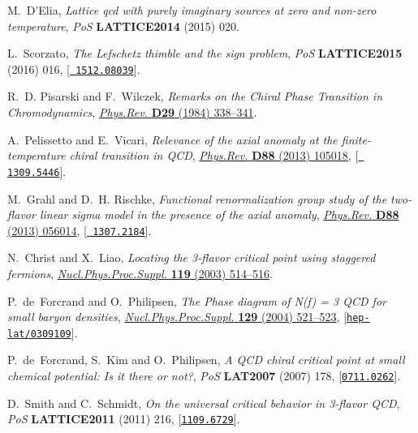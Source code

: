 \documentclass{PoS}
\begin{document}
\begin{thebibliography}{100}
M.~D'Elia, \emph{Lattice qcd with purely imaginary sources at zero and non-zero
  temperature}, {\emph{PoS} {\bf LATTICE2014} (2015) 020}.

L.~Scorzato, \emph{{The Lefschetz thimble and the sign problem}}, {\emph{PoS}
  {\bf LATTICE2015} (2016) 016}, [\href{https://arxiv.org/abs/1512.08039}{{\tt
  1512.08039}}].

R.~D. Pisarski and F.~Wilczek, \emph{{Remarks on the Chiral Phase Transition in
  Chromodynamics}},
  \href{http://dx.doi.org/10.1103/PhysRevD.29.338}{\emph{Phys.Rev.} {\bf D29}
  (1984) 338--341}.

A.~Pelissetto and E.~Vicari, \emph{{Relevance of the axial anomaly at the
  finite-temperature chiral transition in QCD}},
  \href{http://dx.doi.org/10.1103/PhysRevD.88.105018}{\emph{Phys.Rev.} {\bf
  D88} (2013) 105018}, [\href{https://arxiv.org/abs/1309.5446}{{\tt
  1309.5446}}].

M.~Grahl and D.~H. Rischke, \emph{{Functional renormalization group study of
  the two-flavor linear sigma model in the presence of the axial anomaly}},
  \href{http://dx.doi.org/10.1103/PhysRevD.88.056014}{\emph{Phys.Rev.} {\bf
  D88} (2013) 056014}, [\href{https://arxiv.org/abs/1307.2184}{{\tt
  1307.2184}}].

N.~Christ and X.~Liao, \emph{{Locating the 3-flavor critical point using
  staggered fermions}},
  \href{http://dx.doi.org/10.1016/S0920-5632(03)01600-1}{\emph{Nucl.Phys.Proc.Suppl.}
  {\bf 119} (2003) 514--516}.

P.~de~Forcrand and O.~Philipsen, \emph{{The Phase diagram of N(f) = 3 QCD for
  small baryon densities}},
  \href{http://dx.doi.org/10.1016/S0920-5632(03)02628-8}{\emph{Nucl.Phys.Proc.Suppl.}
  {\bf 129} (2004) 521--523},
  [\href{https://arxiv.org/abs/hep-lat/0309109}{{\tt hep-lat/0309109}}].

P.~de~Forcrand, S.~Kim and O.~Philipsen, \emph{{A QCD chiral critical point at
  small chemical potential: Is it there or not?}}, {\emph{PoS} {\bf LAT2007}
  (2007) 178}, [\href{https://arxiv.org/abs/0711.0262}{{\tt 0711.0262}}].

D.~Smith and C.~Schmidt, \emph{{On the universal critical behavior in 3-flavor
  QCD}}, {\emph{PoS} {\bf LATTICE2011} (2011) 216},
  [\href{https://arxiv.org/abs/1109.6729}{{\tt 1109.6729}}].


\end{thebibliography}
\end{document}

